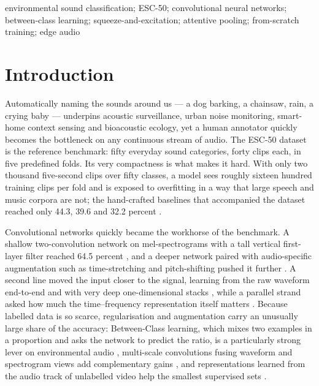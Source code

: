\documentclass[conference]{IEEEtran}
\begin{document}
\begin{IEEEkeywords}
environmental sound classification; ESC-50; convolutional neural networks; between-class learning; squeeze-and-excitation; attentive pooling; from-scratch training; edge audio
\end{IEEEkeywords}

\section{Introduction}
Automatically naming the sounds around us --- a dog barking, a chainsaw, rain, a crying baby --- underpins acoustic surveillance, urban noise monitoring, smart-home context sensing and bioacoustic ecology, yet a human annotator quickly becomes the bottleneck on any continuous stream of audio. The ESC-50 dataset \cite{piczak_dataset} is the reference benchmark: fifty everyday sound categories, forty clips each, in five predefined folds. Its very compactness is what makes it hard. With only two thousand five-second clips over fifty classes, a model sees roughly sixteen hundred training clips per fold and is exposed to overfitting in a way that large speech and music corpora are not; the hand-crafted baselines that accompanied the dataset reached only 44.3, 39.6 and 32.2 percent \cite{piczak_dataset}.

Convolutional networks quickly became the workhorse of the benchmark. A shallow two-convolution network on mel-spectrograms with a tall vertical first-layer filter reached 64.5 percent \cite{piczak_cnn}, and a deeper network paired with audio-specific augmentation such as time-stretching and pitch-shifting pushed it further \cite{salamon_bello}. A second line moved the input closer to the signal, learning from the raw waveform end-to-end \cite{tokozume_envnet} and with very deep one-dimensional stacks \cite{dai_rawwaveform}, while a parallel strand asked how much the time--frequency representation itself matters \cite{huzaifah_tf}. Because labelled data is so scarce, regularisation and augmentation carry an unusually large share of the accuracy: Between-Class learning, which mixes two examples in a proportion and asks the network to predict the ratio, is a particularly strong lever on environmental audio \cite{tokozume_bc}, multi-scale convolutions fusing waveform and spectrogram views add complementary gains \cite{zhu_multiscale}, and representations learned from the audio track of unlabelled video help the smallest supervised sets \cite{aytar_soundnet}.
\end{document}
